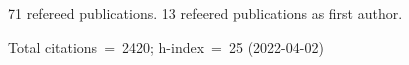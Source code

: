 71 refereed publications. 13 refeered publications as first author.

Total citations~=~2420; h-index~=~25 (2022-04-02)